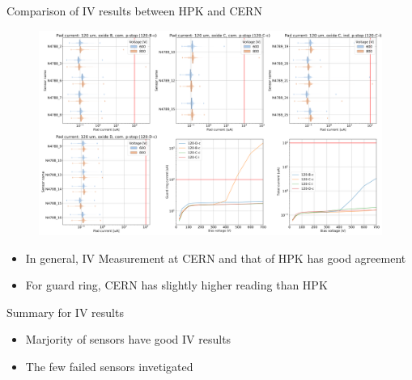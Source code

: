 \documentclass{beamer}
\begin{document}
\begin{frame}{Comparison of IV results between HPK and CERN}
  \begin{figure}
    \includegraphics[width=.7\textwidth]{plots/IV_CERN_HPK_120um.png}
  \end{figure}
  \begin{itemize}
    \scriptsize
      \item In general, IV Measurement at CERN and that of HPK has \alert{good agreement}
      \item For \alert{guard ring}, CERN has slightly higher reading than HPK 
  \end{itemize}
\end{frame}

\begin{frame}{Summary for IV results}
    \begin{table}[htbp] %
        \centering
        \footnotesize%
        \setlength\tabcolsep{2pt}%
        \caption{Summary for all protoA sensors}
        \end{table}   


    \begin{itemize}
        \item \alert{Marjority} of sensors have \alert{good IV} results
        \item The few failed sensors  invetigated
        
        
    \end{itemize}
\end{frame}
\end{document}
